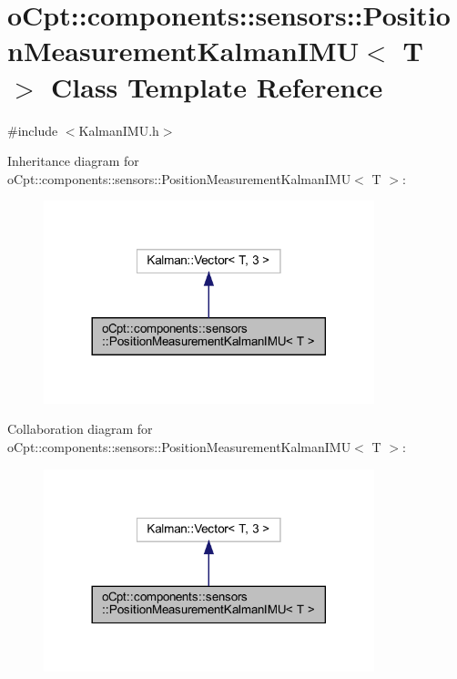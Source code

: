 \hypertarget{classo_cpt_1_1components_1_1sensors_1_1_position_measurement_kalman_i_m_u}{}\section{o\+Cpt\+:\+:components\+:\+:sensors\+:\+:Position\+Measurement\+Kalman\+I\+MU$<$ T $>$ Class Template Reference}
\label{classo_cpt_1_1components_1_1sensors_1_1_position_measurement_kalman_i_m_u}


{\ttfamily \#include $<$Kalman\+I\+M\+U.\+h$>$}



Inheritance diagram for o\+Cpt\+:\+:components\+:\+:sensors\+:\+:Position\+Measurement\+Kalman\+I\+MU$<$ T $>$\+:
\nopagebreak
\begin{figure}[H]
\begin{center}
\leavevmode
\includegraphics[width=272pt]{classo_cpt_1_1components_1_1sensors_1_1_position_measurement_kalman_i_m_u__inherit__graph}
\end{center}
\end{figure}


Collaboration diagram for o\+Cpt\+:\+:components\+:\+:sensors\+:\+:Position\+Measurement\+Kalman\+I\+MU$<$ T $>$\+:
\nopagebreak
\begin{figure}[H]
\begin{center}
\leavevmode
\includegraphics[width=272pt]{classo_cpt_1_1components_1_1sensors_1_1_position_measurement_kalman_i_m_u__coll__graph}
\end{center}
\end{figure}
